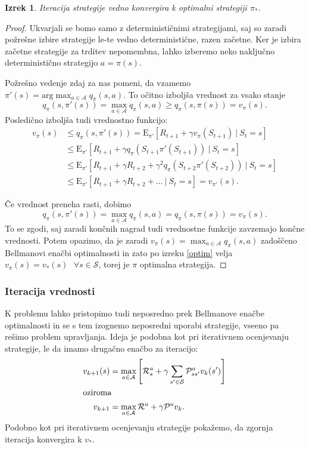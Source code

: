 \documentclass[12pt,a4paper]{amsart}
\theoremstyle{definition} %
\theoremstyle{plain} %
\newtheorem{izrek}[definicija]{Izrek}
\begin{document}
\begin{izrek}\label{iterKonv}
    Iteracija strategije vedno konvergira k optimalni strategiji $\pi_*$.
\end{izrek}

\begin{proof}
    Ukvarjali se bomo samo z determinističnimi strategijami, saj so zaradi požrešne izbire 
    strategije le-te vedno deterministične, razen začetne. Ker je izbira začetne strategije za 
    trditev nepomembna, lahko izberemo neko naključno deterministično strategijo $a = \pi(s)$.

    Požrešno vedenje zdaj za nas pomeni, da vzamemo $\pi'(s) = 
    \text{arg}\max_{a \in \mathcal{A}} q_\pi(s, a)$. To očitno izboljša vrednost za vsako stanje 
    $$
    q_\pi(s, \pi'(s)) = \max_{a \in \mathcal{A}} q_\pi(s, a) \geq q_\pi(s, \pi(s)) = v_\pi(s).
    $$
    Posledično izboljša tudi vrednostno funkcijo: 
    \begin{align*}
        v_\pi(s) &\leq q_\pi(s, \pi'(s)) = \mathrm{E}_{\pi'} [R_{t+1} + 
            \gamma v_\pi(S_{t+1})~|~S_t = s] \\
        &\leq \mathrm{E}_{\pi'} [R_{t+1} + \gamma q_\pi(S_{t+1} \pi'(S_{t+1}))~|~S_t = s] \\
        &\leq \mathrm{E}_{\pi'} [R_{t+1} + \gamma R_{t+2} + 
            \gamma^2 q_\pi(S_{t+2} \pi'(S_{t+2}))~|~S_t = s] \\
        &\leq \mathrm{E}_{\pi'} [R_{t+1} + \gamma R_{t+2} + \dots~|~S_t = s] = v_{\pi'}(s).
    \end{align*}

Če vrednost preneha rasti, dobimo 
$$
q_\pi(s, \pi'(s)) = \max_{a \in \mathcal{A}} q_\pi(s, a) = q_\pi(s, \pi(s)) = v_\pi(s).
$$
To se zgodi, saj zaradi končnih nagrad tudi vrednostne funkcije zavzemajo končne vrednosti. 
Potem opazimo, da je zaradi $v_\pi(s) = \max_{a \in \mathcal{A}} q_\pi(s, a)$ zadoščeno Bellmanovi 
enačbi optimalnosti in zato po izreku \ref{optim} velja $v_\pi(s) = 
v_*(s) \text{ } \forall s \in \mathcal{S}$, torej je $\pi$ optimalna strategija.
\end{proof}

\subsubsection{Iteracija vrednosti}
K problemu lahko pristopimo tudi neposredno prek Bellmanove enačbe optimalnosti in se s tem 
izognemo neposredni uporabi strategije, vseeno pa rešimo problem upravljanja. Ideja je podobna kot 
pri iterativnem ocenjevanju strategije, le da imamo drugačno enačbo za iteracijo: 
\begin{align*}
    v_{k+1}(s) &= \max_{a \in \mathcal{A}} \left[ \mathcal{R}_s^a + 
        \gamma \sum_{s' \in \mathcal{S}} \mathcal{P}_{ss'}^a v_k(s') \right] \\
    \intertext{oziroma}
    v_{k+1} &= \max_{a \in \mathcal{A}} \mathcal{R}^a + \gamma \mathcal{P}^a v_k.
\end{align*}
Podobno kot pri iterativnem ocenjevanju strategije pokažemo, da zgornja iteracija konvergira k 
$v_*$.
\end{document}
